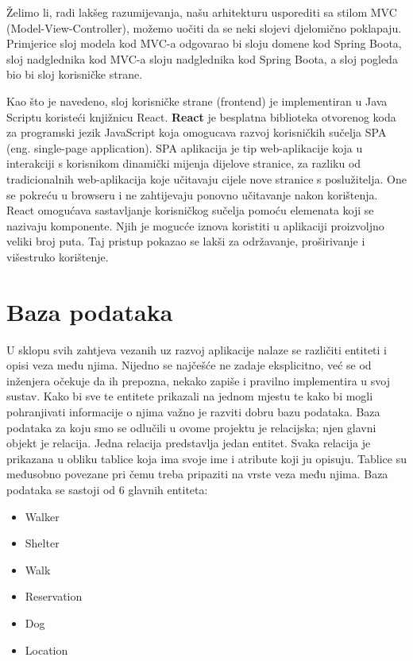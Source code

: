 Želimo li, radi lakšeg razumijevanja, našu arhitekturu usporediti sa stilom MVC (Model-View-Controller), možemo uočiti da se neki slojevi djelomično poklapaju. Primjerice sloj modela kod MVC-a
odgovarao bi sloju domene kod Spring Boota, sloj nadglednika kod MVC-a sloju
nadglednika kod Spring Boota, a sloj pogleda bio bi sloj korisničke strane. 


\vspace{15pt}
Kao što je navedeno, sloj korisničke strane (frontend) je implementiran u Java Scriptu koristeći knjižnicu React. \textbf{React} je besplatna biblioteka otvorenog koda za programski jezik JavaScript koja omogucava razvoj korisničkih sučelja SPA (eng. single-page application). SPA aplikacija je
tip web-aplikacije koja u interakciji s korisnikom dinamički mijenja dijelove stranice, za razliku od tradicionalnih web-aplikacija koje učitavaju cijele nove stranice s poslužitelja. One se pokreću u browseru i ne zahtijevaju ponovno učitavanje nakon korištenja.
React omogućava sastavljanje korisničkog sučelja pomoću elemenata koji se nazivaju komponente. Njih je mogucće iznova koristiti u aplikaciji proizvoljno veliki broj puta. Taj pristup pokazao se lakši za održavanje, proširivanje i višestruko korištenje.

\newpage



	
		

		

				
		\section{Baza podataka}
			
			U sklopu svih zahtjeva vezanih uz razvoj aplikacije nalaze se različiti entiteti i opisi veza među njima. Nijedno se najčešće ne zadaje eksplicitno, već se od inženjera očekuje da ih prepozna, nekako zapiše i pravilno implementira u svoj sustav. Kako bi sve te entitete prikazali na jednom mjestu te kako bi mogli pohranjivati informacije o njima važno je razviti dobru bazu podataka. Baza podataka za koju smo se odlučili u ovome projektu je relacijska; njen glavni objekt je relacija. Jedna relacija predstavlja jedan entitet. Svaka relacija je prikazana u obliku tablice koja ima svoje ime i atribute koji ju opisuju. Tablice su međusobno povezane pri čemu treba pripaziti na vrste veza među njima.  
			Baza podataka se sastoji od 6 glavnih entiteta:
			
			\begin{itemize}
				\item Walker 
				\item Shelter
				\item Walk
				\item Reservation
				\item Dog
				\item Location 
			\end{itemize}
		
